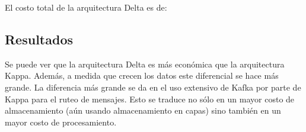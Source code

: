 El costo total de la arquitectura Delta es de:
\newline
\newline
{}
\newpage

\subsection{Resultados}

Se puede ver que la arquitectura Delta es más económica que la arquitectura Kappa.
Además, a medida que crecen los datos este diferencial se hace más grande.
La diferencia más grande se da en el uso extensivo de Kafka por parte de Kappa para el ruteo de mensajes. 
Esto se traduce no sólo en un mayor costo de almacenamiento (aún usando almacenamiento en capas) sino también en un mayor costo de procesamiento.
\newpage